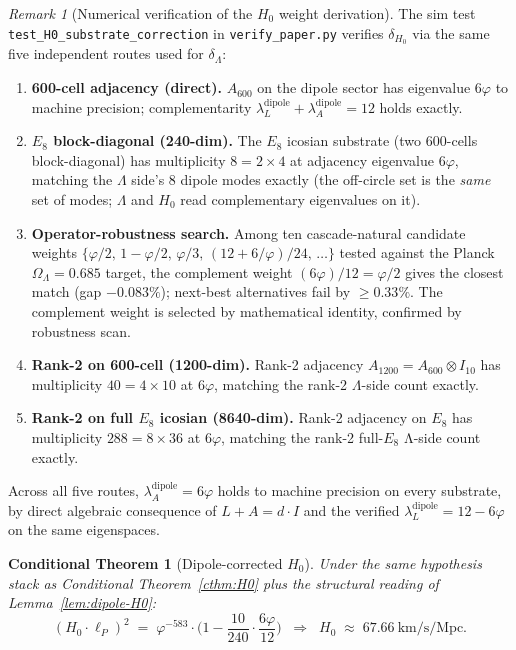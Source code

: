 \documentclass[11pt]{article}
\theoremstyle{plain}
\newtheorem{conditional}[theorem]{Conditional Theorem}
\theoremstyle{definition}
\theoremstyle{remark}
\newtheorem{remark}[theorem]{Remark}
\begin{document}
\begin{remark}[Numerical verification of the $H_0$ weight derivation]
The sim test \texttt{test\_H0\_substrate\_correction} in \texttt{verify\_paper.py} verifies $\delta_{H_0}$ via the same five independent routes used for $\delta_\Lambda$:
\begin{enumerate}[leftmargin=2em]
\item \textbf{600-cell adjacency (direct).} $A_{600}$ on the dipole sector has eigenvalue $6\varphi$ to machine precision; complementarity $\lambda_L^\mathrm{dipole} + \lambda_A^\mathrm{dipole} = 12$ holds exactly.
\item \textbf{$E_8$ block-diagonal (240-dim).} The $E_8$ icosian substrate (two 600-cells block-diagonal) has multiplicity $8 = 2 \times 4$ at adjacency eigenvalue $6\varphi$, matching the $\Lambda$ side's 8 dipole modes exactly (the off-circle set is the \emph{same} set of modes; $\Lambda$ and $H_0$ read complementary eigenvalues on it).
\item \textbf{Operator-robustness search.} Among ten cascade-natural candidate weights $\{\varphi/2,\, 1 - \varphi/2,\, \varphi/3,\, (12 + 6/\varphi)/24,\, \ldots\}$ tested against the Planck $\Omega_\Lambda = 0.685$ target, the complement weight $(6\varphi)/12 = \varphi/2$ gives the closest match (gap $-0.083\%$); next-best alternatives fail by $\geq 0.33\%$. The complement weight is selected by mathematical identity, confirmed by robustness scan.
\item \textbf{Rank-2 on 600-cell (1200-dim).} Rank-2 adjacency $A_{1200} = A_{600} \otimes I_{10}$ has multiplicity $40 = 4 \times 10$ at $6\varphi$, matching the rank-2 $\Lambda$-side count exactly.
\item \textbf{Rank-2 on full $E_8$ icosian (8640-dim).} Rank-2 adjacency on $E_8$ has multiplicity $288 = 8 \times 36$ at $6\varphi$, matching the rank-2 full-$E_8$ Λ-side count exactly.
\end{enumerate}
Across all five routes, $\lambda_A^\mathrm{dipole} = 6\varphi$ holds to machine precision on every substrate, by direct algebraic consequence of $L + A = d \cdot I$ and the verified $\lambda_L^\mathrm{dipole} = 12 - 6\varphi$ on the same eigenspaces.
\end{remark}

\begin{conditional}[Dipole-corrected $H_0$]\label{cthm:H0-dipole}
Under the same hypothesis stack as Conditional Theorem~\ref{cthm:H0} plus the structural reading of Lemma~\ref{lem:dipole-H0}:
\[
  \boxed{\;(H_0 \cdot \ell_P)^2 \;=\; \varphi^{-583} \cdot \Big(1 - \frac{10}{240} \cdot \frac{6\varphi}{12}\Big) \;\;\Longrightarrow\;\; H_0 \;\approx\; 67.66~\text{km/s/Mpc}.\;}
\]
\end{conditional}
\end{document}
